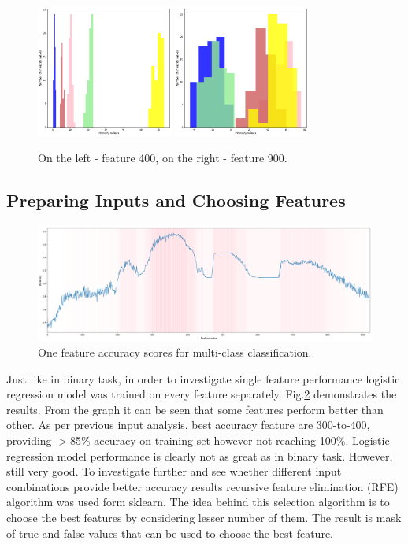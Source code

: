 \documentclass[11pt]{article}
\begin{document}
		\begin{figure}
			\hfill
				\includegraphics[width=0.4\textwidth]{png/400_multi.png}
			\hfill
				\includegraphics[width=0.4\textwidth]{png/900_multi.png}
			\hfill
			\label{fig:400_900}
			\caption{On the left - feature 400, on the right - feature 900.}
		\end{figure}

		\subsection{Preparing Inputs and Choosing Features}
			\begin{figure}[H]
				\includegraphics[width=1\textwidth]{png/multi_one}
				\caption{One feature accuracy scores for multi-class classification.}
				\label{fig:multi_one}
			\end{figure}

			Just like in binary task, in order to investigate single feature performance logistic regression model was trained on every feature separately. Fig.\ref{fig:multi_one} demonstrates the results. From the graph it can be seen that some features perform better than other. As per previous input analysis, best accuracy feature are 300-to-400, providing $>$85\% accuracy on training set however not reaching 100\%. Logistic regression model performance is clearly not as great as in binary task. However, still very good. To investigate further and see whether different input combinations provide better accuracy results recursive feature elimination (RFE) algorithm was used form sklearn. The idea behind this selection algorithm is to choose the best features by considering lesser number of them. The result is mask of true and false values that can be used to choose the best feature. 
\end{document}
